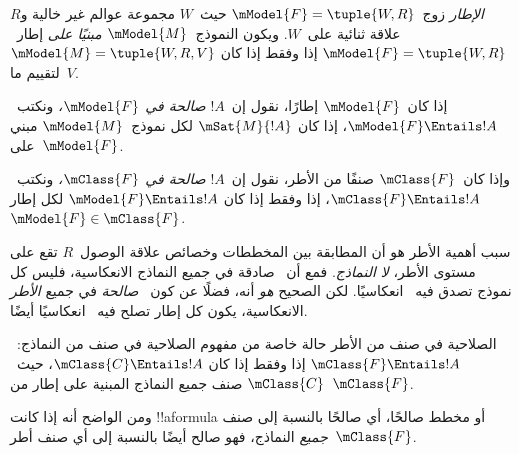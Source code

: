 \documentclass[../../../include/open-logic-section]{subfiles}
\begin{document}


\begin{defn}
  \emph{الإطار} زوج~$\mModel{F} = \tuple{W,R}$ حيث~$W$ مجموعة عوالم
  غير خالية و$R$ علاقة ثنائية على~$W$. ويكون النموذج~$\mModel{M}$
  \emph{مبنيًا على} إطار~$\mModel{F} = \tuple{W,R}$ إذا وفقط إذا كان
  $\mModel{M} = \tuple{W, R, V}$ لتقييم ما~$V$.
\end{defn}

\begin{defn}
  إذا كان~$\mModel{F}$ إطارًا، نقول إن~$!A$ \emph{صالحة في
    $\mModel{F}$،} ونكتب~$\mModel{F} \Entails !A$، إذا كان
  $\mSat{M}{!A}$ لكل نموذج~$\mModel{M}$ مبني على~$\mModel{F}$.

  وإذا كان~$\mClass{F}$ صنفًا من الأطر، نقول إن~$!A$ \emph{صالحة في
    $\mClass{F}$،} ونكتب~$\mClass{F} \Entails !A$، إذا وفقط إذا كان
  $\mModel{F} \Entails !A$ لكل إطار~$\mModel{F} \in \mClass{F}$.
\end{defn}

سبب أهمية الأطر هو أن المطابقة بين المخططات وخصائص علاقة الوصول~$R$
تقع على مستوى الأطر، \emph{لا النماذج}. فمع أن~ صادقة في جميع
النماذج الانعكاسية، فليس كل نموذج تصدق فيه~ انعكاسيًا. لكن
الصحيح \emph{هو} أنه، فضلًا عن كون~ \emph{صالحة} في جميع
\emph{الأطر} الانعكاسية، يكون كل إطار تصلح فيه~ انعكاسيًا أيضًا.

\begin{rem}
الصلاحية في صنف من الأطر حالة خاصة من مفهوم الصلاحية في صنف من
النماذج:~$\mClass{F} \Entails !A$ إذا وفقط إذا كان
$\mClass{C} \Entails !A$، حيث~$\mClass{C}$ صنف جميع النماذج المبنية
على إطار من~$\mClass{F}$.

ومن الواضح أنه إذا كانت !!a{formula} أو مخطط صالحًا، أي صالحًا
بالنسبة إلى صنف \emph{جميع} النماذج، فهو صالح أيضًا بالنسبة إلى أي
صنف أطر~$\mClass{F}$.
\end{rem}
\end{document}
